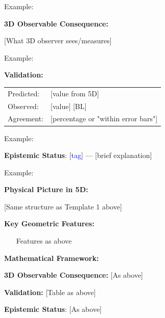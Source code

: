 \begin{mdframed}[frametitle={\colorbox{white}{\textbf{5D Mechanism: [Title]}}},
                 linewidth=2pt,
                 linecolor=blue!75!black,
                 backgroundcolor=blue!5]
Example:

\textbf{3D Observable Consequence:}

[What 3D observer sees/measures]

Example:

\textbf{Validation:}

\begin{tabular}{ll}
Predicted: & [value from 5D] \\
Observed: & [value] [BL] \\
Agreement: & [percentage or "within error bars"] \\
\end{tabular}

Example:

\textbf{Epistemic Status}: [\textcolor{blue}{tag}] — [brief explanation]

Example:

\end{mdframed}


\begin{tcolorbox}[colback=blue!5,
                  colframe=blue!75!black,
                  title=\textbf{5D Mechanism: [Title]},
                  fonttitle=\bfseries,
                  boxrule=2pt]

\textbf{Physical Picture in 5D:}

[Same structure as Template 1 above]

\textbf{Key Geometric Features:}
\begin{itemize}
\item [Features as above]
\end{itemize}

\textbf{Mathematical Framework:}
\begin{equation}
[Equations as above]
\end{equation}

\textbf{3D Observable Consequence:}
[As above]

\textbf{Validation:}
[Table as above]

\textbf{Epistemic Status}: [As above]

\end{tcolorbox}


